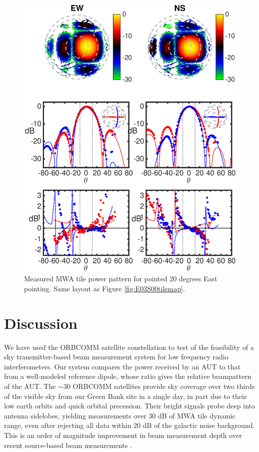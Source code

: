 \begin{figure}
\includegraphics[width=5in]{chap1_precision_beammapping_figures/W03S00_abs.eps}
\caption[The measured MWA tile beampattern for the 20 degree East pointing.]{Measured MWA tile power pattern for pointed 20 degrees East pointing. Same layout as Figure \ref{fig:E03S00tilemap}.}
\label{fig:W03S00tilemap}
\end{figure}


\section{Discussion}
\label{sec:discussion}

We have used the ORBCOMM satellite constellation to test of the feasibility of a sky transmitter-based beam measurement system for low frequency radio interferometers. Our system compares the power received by an AUT to that from a well-modeled reference dipole, whose ratio gives the relative beampattern of the AUT. The $\sim30$ ORBCOMM satellites provide sky coverage over two thirds of the visible sky from our Green Bank site in a single day, in part due to their low earth orbits and quick orbital precession. Their bright signals probe deep into antenna sidelobes, yielding measurements over 30 dB of MWA tile dynamic range, even after rejecting all data within 20 dB of the galactic noise background. This is an order of magnitude improvement in beam measurement depth over recent source-based beam measurements \citep{aavs}.

